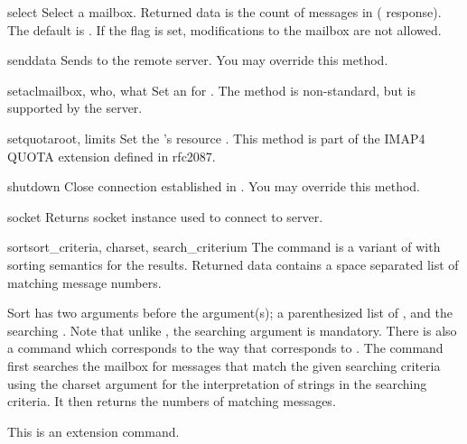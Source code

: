 \begin{methoddesc}{select}{}
  Select a mailbox. Returned data is the count of messages in
   ( response).  The default 
  is .  If the  flag is set, modifications
  to the mailbox are not allowed.
\end{methoddesc}

\begin{methoddesc}{send}{data}
  Sends  to the remote server.
  You may override this method.
\end{methoddesc}

\begin{methoddesc}{setacl}{mailbox, who, what}
  Set an  for .
  The method is non-standard, but is supported by the  server.
\end{methoddesc}

\begin{methoddesc}{setquota}{root, limits}
  Set the  's resource .
  This method is part of the IMAP4 QUOTA extension defined in rfc2087.
\end{methoddesc}

\begin{methoddesc}{shutdown}{}
  Close connection established in .
  You may override this method.
\end{methoddesc}

\begin{methoddesc}{socket}{}
  Returns socket instance used to connect to server.
\end{methoddesc}

\begin{methoddesc}{sort}{sort_criteria, charset, search_criterium}
  The  command is a variant of  with sorting semantics for
  the results.  Returned data contains a space
  separated list of matching message numbers.

  Sort has two arguments before the 
  argument(s); a parenthesized list of , and the searching .
  Note that unlike , the searching  argument is mandatory.
  There is also a  command which corresponds to  the way
  that  corresponds to .
  The  command first searches the mailbox for messages that
  match the given searching criteria using the charset argument for
  the interpretation of strings in the searching criteria.  It then
  returns the numbers of matching messages.

  This is an  extension command.
\end{methoddesc}

